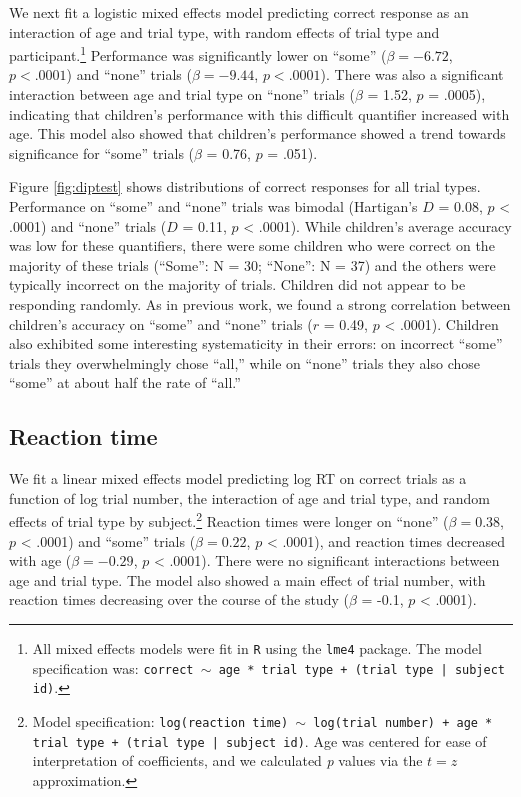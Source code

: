 \documentclass[10pt, letterpaper]{article}
\begin{document}
We next fit a logistic mixed effects model predicting correct response
as an interaction of age and trial type, with random effects of trial
type and
participant.\footnote{All mixed effects models were fit in \texttt{R} using the \texttt{lme4} package. The model specification was: \texttt{correct $\sim$ age * trial type + (trial type | subject id)}.}
Performance was significantly lower on ``some'' (\(\beta = -6.72\),
\(p < .0001\)) and ``none'' trials (\(\beta = -9.44\), \(p < .0001\)).
There was also a significant interaction between age and trial type on
``none'' trials (\(\beta\) = 1.52, \(p\) = .0005), indicating that
children's performance with this difficult quantifier increased with
age. This model also showed that children's performance showed a trend
towards significance for ``some'' trials (\(\beta\) = 0.76, \(p\) =
.051).

Figure \ref{fig:diptest} shows distributions of correct responses for
all trial types. Performance on ``some'' and ``none'' trials was bimodal
(Hartigan's \(D\) = 0.08, \(p\) \textless{} .0001) and ``none'' trials
(\(D\) = 0.11, \(p\) \textless{} .0001). While children's average
accuracy was low for these quantifiers, there were some children who
were correct on the majority of these trials (``Some'': N = 30;
``None'': N = 37) and the others were typically incorrect on the
majority of trials. Children did not appear to be responding randomly.
As in previous work, we found a strong correlation between children's
accuracy on ``some'' and ``none'' trials (\(r\) = 0.49, \(p\)
\textless{} .0001). Children also exhibited some interesting
systematicity in their errors: on incorrect ``some'' trials they
overwhelmingly chose ``all,'' while on ``none'' trials they also chose
``some'' at about half the rate of ``all.''

\subsection{Reaction time}\label{reaction-time}

We fit a linear mixed effects model predicting log RT on correct trials
as a function of log trial number, the interaction of age and trial
type, and random effects of trial type by subject.\footnote{Model
  specification:
  \texttt{log(reaction time) $\sim$ log(trial number) + age * trial type + (trial type | subject id)}.
  Age was centered for ease of interpretation of coefficients, and we
  calculated \emph{p} values via the \(t=z\) approximation.} Reaction
times were longer on ``none'' (\(\beta = 0.38\), \(p\) \textless{}
.0001) and ``some'' trials (\(\beta = 0.22\), \(p\) \textless{} .0001),
and reaction times decreased with age (\(\beta = -0.29\), \(p\)
\textless{} .0001). There were no significant interactions between age
and trial type. The model also showed a main effect of trial number,
with reaction times decreasing over the course of the study (\(\beta\) =
-0.1, \(p\) \textless{} .0001).
\end{document}
